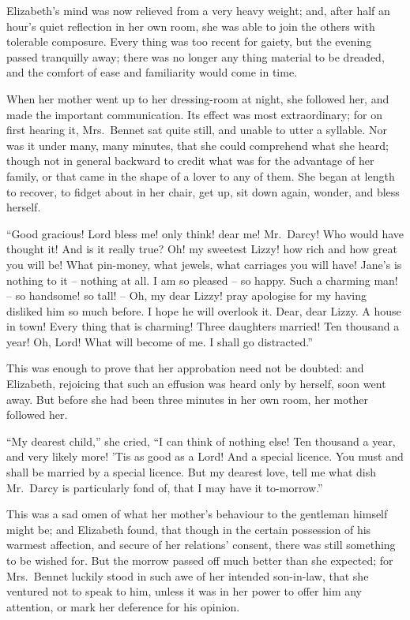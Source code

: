 Elizabeth’s mind was now relieved from a very heavy
weight; and, after half an hour’s quiet reflection in her
own room, she was able to join the others with tolerable
composure. Every thing was too recent for gaiety, but
the evening passed tranquilly away; there was no longer
any thing material to be dreaded, and the comfort of
ease and familiarity would come in time.

When her mother went up to her dressing-room at
night, she followed her, and made the important
communication. Its effect was most extraordinary; for on
first hearing it, Mrs.\ Bennet sat quite still, and unable to
utter a syllable. Nor was it under many, many minutes,
that she could comprehend what she heard; though not
in general backward to credit what was for the advantage
of her family, or that came in the shape of a lover to any
of them. She began at length to recover, to fidget about
in her chair, get up, sit down again, wonder, and bless
herself.

“Good gracious! Lord bless me! only think! dear
me! Mr.\ Darcy! Who would have thought it! And
is it really true? Oh! my sweetest Lizzy! how rich and
how great you will be! What pin-money, what jewels,
what carriages you will have! Jane’s is nothing to it -- nothing
at all. I am so pleased -- so happy. Such a charming
man! -- so handsome! so tall! -- Oh, my dear Lizzy!
pray apologise for my having disliked him so much before.
I hope he will overlook it. Dear, dear Lizzy. A house
in town! Every thing that is charming! Three daughters
married! Ten thousand a year! Oh, Lord! What will
become of me. I shall go distracted.”

This was enough to prove that her approbation need
not be doubted: and Elizabeth, rejoicing that such an
effusion was heard only by herself, soon went away. But
before she had been three minutes in her own room, her
mother followed her.

“My dearest child,” she cried, “I can think of nothing
else! Ten thousand a year, and very likely more! ’Tis
as good as a Lord! And a special licence. You must and
shall be married by a special licence. But my dearest
love, tell me what dish Mr.\ Darcy is particularly fond of,
that I may have it to-morrow.”

This was a sad omen of what her mother’s behaviour
to the gentleman himself might be; and Elizabeth found,
that though in the certain possession of his warmest
affection, and secure of her relations’ consent, there was
still something to be wished for. But the morrow passed
off much better than she expected; for Mrs.\ Bennet
luckily stood in such awe of her intended son-in-law, that
she ventured not to speak to him, unless it was in her
power to offer him any attention, or mark her deference
for his opinion.

